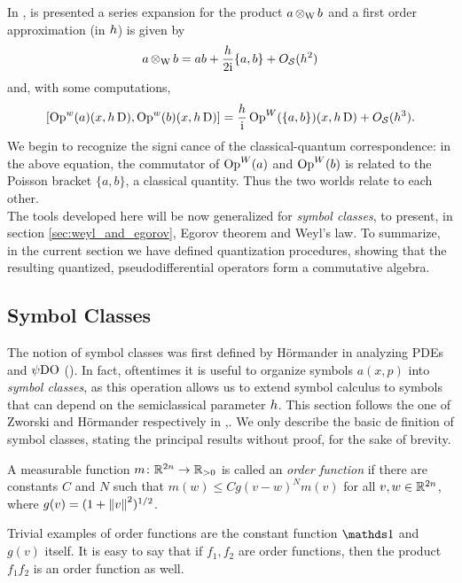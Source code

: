 In \cite{Martinez:semi},\cite{Zworski:semic} is presented a series expansion for the product $a\operatorname{\otimes_{W}} b$ and a first order approximation (in $h$) is given by
\[
a\operatorname{\otimes_{W}} b =ab+\frac{h}{2\mathrm{i}}\{a,b\}+O_{\mathcal{S}}(h^{2})
\]
and, with some computations,
\[
[\operatorname{Op}^{w}(a)(x,h\operatorname{D}),\operatorname{Op}^{w}(b)(x,h\operatorname{D})]=\frac{h}{\mathrm{i}}\operatorname{Op}^{W}(\{a,b\})(x,h\operatorname{D})+O_{\mathcal{S}}(h^{3}).
\]
We begin to recognize the signicance of the classical-quantum correspondence: in the above equation, the commutator of $\operatorname{Op}^{W}(a)$ and $\operatorname{Op}^{W}(b)$ is related to the Poisson bracket $\{a,b\}$, a classical quantity. Thus the two worlds relate to each other.\\
The tools developed here will be now generalized for \emph{symbol classes}, to present, in section \ref{sec:weyl_and_egorov}, Egorov theorem and Weyl's law. To summarize, in the current section we have defined quantization
procedures, showing that the resulting quantized, pseudodifferential operators form a commutative algebra.


\subsection{Symbol Classes}


The notion of symbol classes was first defined by H{\"o}rmander in analyzing PDEs and $\operatorname{\psi DO}$ (\cite{Horm:book3}). In fact, oftentimes it is useful to organize symbols $a(x,p)$ into \emph{symbol classes}, as this operation allows us to extend symbol calculus to symbols that can depend on the semiclassical parameter $h$. This section follows the one of Zworski and H{\"o}rmander respectively in \cite{Zworski:semic},\cite{Horm:book3}. We only describe the basic definition of symbol classes, stating the principal results without proof, for the sake of brevity.

\begin{defin}
\label{def:order_func}
A measurable function $m\colon\mathbb{R}^{2n}\to\mathbb{R}_{>0}$ is called an \emph{order function} if there are constants $C$ and $N$ such that $m(w)\leq Cg(v-w)^{N}m(v)$ for all $v,w\in\mathbb{R}^{2n}$, where $g(v)=(1+\left\lVert v\right\rVert^{2})^{1/2}$.
\end{defin}

Trivial examples of order functions are the constant function $\one$ and $g(v)$ itself. It is easy to say that if $f_{1},f_{2}$ are order functions, then the product $f_{1}f_{2}$ is an order function as well.

